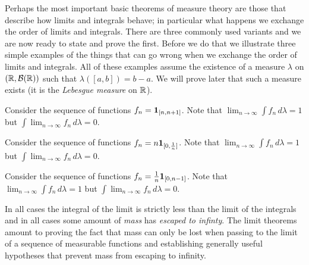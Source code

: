 Perhaps the most important basic theorems of measure theory are those
that describe how limits and integrals behave; in particular what
happens we exchange the order of limits and integrals.  There are three
commonly used variants and we are now ready to state and prove the
first.  Before we do that we illustrate three simple examples of the
things that can go wrong when we exchange the order of limits and
integrals.  All of these examples assume the existence of a measure
$\lambda$ on
$(\mathbb{R},\mathcal{B}(\mathbb{R}))$ such that $\lambda([a,b]) = b -a$.  We
will prove later that such a measure exists (it is the \emph{Lebesgue
  measure} on $\mathbb{R}$).
\begin{examp}Consider the sequence of functions 
$f_n = \textbf{1}_{[n,n+1]}$.  Note that $\lim_{n \to \infty}
\int f_n \, d \lambda = 1$ but $\int \lim_{n \to \infty}  f_n \, d
\lambda = 0$.
\end{examp}
\begin{examp}Consider the sequence of functions 
$f_n = n \textbf{1}_{[0,\frac{1}{n}]}$.  Note that $\lim_{n \to \infty}
\int f_n \, d \lambda = 1$ but $\int \lim_{n \to \infty}  f_n \, d
\lambda = 0$.
\end{examp}
\begin{examp}Consider the sequence of functions 
$f_n = \frac{1}{n}\textbf{1}_{[0,n-1]}$.  Note that $\lim_{n \to \infty}
\int f_n \, d \lambda = 1$ but $\int \lim_{n \to \infty}  f_n \, d
\lambda = 0$.
\end{examp}
 In all cases the integral of the limit is strictly less than the limit
of the integrals and in all cases some amount of \emph{mass} has
\emph{escaped to infinty}.  The limit theorems amount to proving the
fact that mass can only be lost when passing to the limit of a
sequence of measurable functions and establishing generally useful
hypotheses that prevent mass from escaping to infinity.

